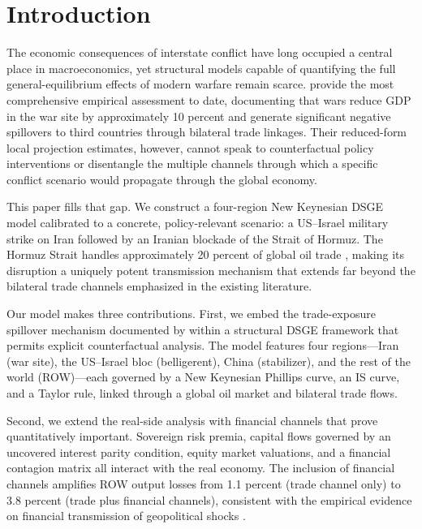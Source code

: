 \documentclass[12pt,a4paper]{article}
\begin{document}
\section{Introduction}

The economic consequences of interstate conflict have long occupied a central place in macroeconomics, yet structural models capable of quantifying the full general-equilibrium effects of modern warfare remain scarce. \citet{federle2026price} provide the most comprehensive empirical assessment to date, documenting that wars reduce GDP in the war site by approximately 10 percent and generate significant negative spillovers to third countries through bilateral trade linkages. Their reduced-form local projection estimates, however, cannot speak to counterfactual policy interventions or disentangle the multiple channels through which a specific conflict scenario would propagate through the global economy.

This paper fills that gap. We construct a four-region New Keynesian DSGE model calibrated to a concrete, policy-relevant scenario: a US--Israel military strike on Iran followed by an Iranian blockade of the Strait of Hormuz. The Hormuz Strait handles approximately 20 percent of global oil trade \citep{eia2023hormuz}, making its disruption a uniquely potent transmission mechanism that extends far beyond the bilateral trade channels emphasized in the existing literature.

Our model makes three contributions. First, we embed the trade-exposure spillover mechanism documented by \citet{federle2026price} within a structural DSGE framework that permits explicit counterfactual analysis. The model features four regions---Iran (war site), the US--Israel bloc (belligerent), China (stabilizer), and the rest of the world (ROW)---each governed by a New Keynesian Phillips curve, an IS curve, and a Taylor rule, linked through a global oil market and bilateral trade flows.

Second, we extend the real-side analysis with financial channels that prove quantitatively important. Sovereign risk premia, capital flows governed by an uncovered interest parity condition, equity market valuations, and a financial contagion matrix all interact with the real economy. The inclusion of financial channels amplifies ROW output losses from 1.1 percent (trade channel only) to 3.8 percent (trade plus financial channels), consistent with the empirical evidence on financial transmission of geopolitical shocks \citep{caldara2022measuring}.
\end{document}
